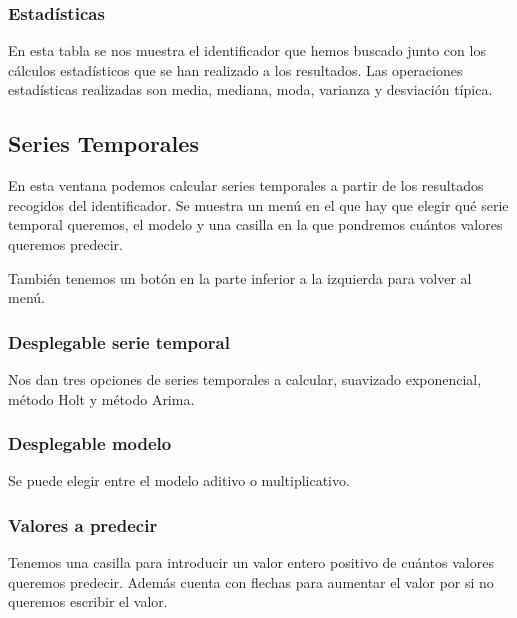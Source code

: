 
\subsubsection{Estadísticas}
En esta tabla se nos muestra el identificador que hemos buscado junto con los cálculos estadísticos que se han realizado a los resultados. Las operaciones estadísticas realizadas son media, mediana, moda, varianza y desviación típica.


\subsection{Series Temporales}
En esta ventana podemos calcular series temporales a partir de los resultados recogidos del identificador. 
Se muestra un menú en el que hay que elegir qué serie temporal queremos, el modelo y una casilla en la que pondremos cuántos valores queremos predecir.


También tenemos un botón en la parte inferior a la izquierda para volver al menú.


\subsubsection{Desplegable serie temporal}
Nos dan tres opciones de series temporales a calcular, suavizado exponencial, método Holt y método Arima.


\subsubsection{Desplegable modelo}
Se puede elegir entre el modelo aditivo o multiplicativo.


\subsubsection{Valores a predecir}
Tenemos una casilla para introducir un valor entero positivo de cuántos valores queremos predecir. Además cuenta con flechas para aumentar el valor por si no queremos escribir el valor.

